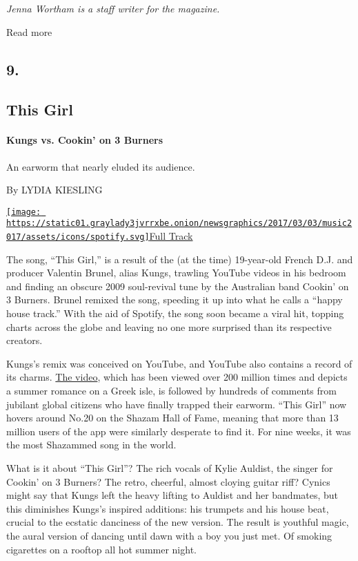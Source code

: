 \emph{Jenna Wortham is a staff writer for the magazine.}

Read more

\hypertarget{9}{%
\subsection{9.}\label{9}}

\hypertarget{--this-girl}{%
\subsection{\texorpdfstring{ This
Girl}{  This Girl}}\label{--this-girl}}

\hypertarget{kungs-vs-cookin-on-3-burners}{%
\paragraph{Kungs vs. Cookin' on 3
Burners}\label{kungs-vs-cookin-on-3-burners}}

An earworm that nearly eluded its audience.

By LYDIA KIESLING

\href{https://open.spotify.com/track/1A8j067qyiNwQnZT0bzUpZ}{\texttt{[image: https://static01.graylady3jvrrxbe.onion/newsgraphics/2017/03/03/music2017/assets/icons/spotify.svg]}Full
Track}

The song, ``This Girl,'' is a result of the (at the time) 19-year-old
French D.J. and producer Valentin Brunel, alias Kungs, trawling YouTube
videos in his bedroom and finding an obscure 2009 soul-revival tune by
the Australian band Cookin' on 3 Burners. Brunel remixed the song,
speeding it up into what he calls a ``happy house track.'' With the aid
of Spotify, the song soon became a viral hit, topping charts across the
globe and leaving no one more surprised than its respective creators.

Kungs's remix was conceived on YouTube, and YouTube also contains a
record of its charms. \href{https://youtu.be/2Y6Nne8RvaA}{The video},
which has been viewed over 200 million times and depicts a summer
romance on a Greek isle, is followed by hundreds of comments from
jubilant global citizens who have finally trapped their earworm. ``This
Girl'' now hovers around No.20 on the Shazam Hall of Fame, meaning that
more than 13 million users of the app were similarly desperate to find
it. For nine weeks, it was the most Shazammed song in the world.

What is it about ``This Girl''? The rich vocals of Kylie Auldist, the
singer for Cookin' on 3 Burners? The retro, cheerful, almost cloying
guitar riff? Cynics might say that Kungs left the heavy lifting to
Auldist and her bandmates, but this diminishes Kungs's inspired
additions: his trumpets and his house beat, crucial to the ecstatic
danciness of the new version. The result is youthful magic, the aural
version of dancing until dawn with a boy you just met. Of smoking
cigarettes on a rooftop all hot summer night.

